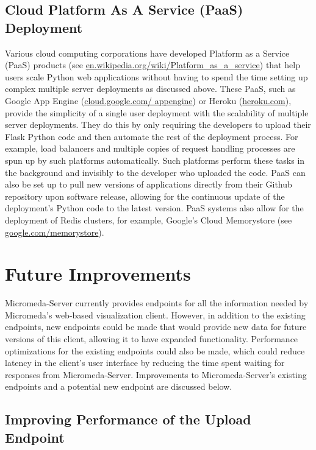 \subsection{Cloud Platform As A Service (PaaS) Deployment}

Various cloud computing corporations have developed Platform as a Service (PaaS) \cite{lawton2008developing} products (see \href{en.wikipedia.org/wiki/Platform\_as\_a\_service}{en.wikipedia.org/wiki/Platform\_as\_a\_service}) that help users scale Python web applications without having to spend the time setting up complex multiple server deployments as discussed above. These PaaS, such as Google App Engine (\href{cloud.google.com/appengine}{cloud.google.com/ appengine}) or Heroku (\href{heroku.com}{heroku.com}), provide the simplicity of a single user deployment with the scalability of multiple server deployments. They do this by only requiring the developers to upload their Flask Python code and then automate the rest of the deployment process. For example, load balancers and multiple copies of request handling processes are spun up by such platforms automatically. Such platforms perform these tasks in the background and invisibly to the developer who uploaded the code. PaaS can also be set up to pull new versions of applications directly from their Github repository upon software release, allowing for the continuous update of the deployment's Python code to the latest version. PaaS systems also allow for the deployment of Redis clusters, for example, Google's Cloud Memorystore (see \href{cloud.google.com/memorystore/}{google.com/memorystore}).

\section{Future Improvements} \label{micromeda-server-improvements}

Micromeda-Server currently provides endpoints for all the information needed by Micromeda's web-based visualization client. However, in addition to the existing endpoints, new endpoints could be made that would provide new data for future versions of this client, allowing it to have expanded functionality. Performance optimizations for the existing endpoints could also be made, which could reduce latency in the client's user interface by reducing the time spent waiting for responses from Micromeda-Server. Improvements to Micromeda-Server's existing endpoints and a potential new endpoint are discussed below.

\subsection{Improving Performance of the Upload Endpoint}

